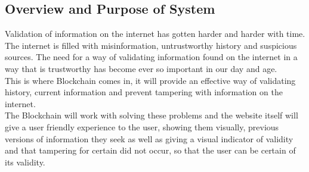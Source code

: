 \subsection{Overview and Purpose of System}

Validation of information on the internet has gotten harder and harder with time.
The internet is filled with misinformation, untrustworthy history and suspicious 
sources. The need for a way of validating information found on the internet in a 
way that is trustworthy has become ever so important in our day and age.\\

This is where Blockchain comes in, it will provide an effective way of validating
history, current information and prevent tampering with information on the internet.\\

The Blockchain will work with solving these problems and the website itself will
give a user friendly experience to the user, showing them visually, previous versions
of information they seek as well as giving a visual indicator of validity and that
tampering for certain did not occur, so that the user can be certain of its validity.
